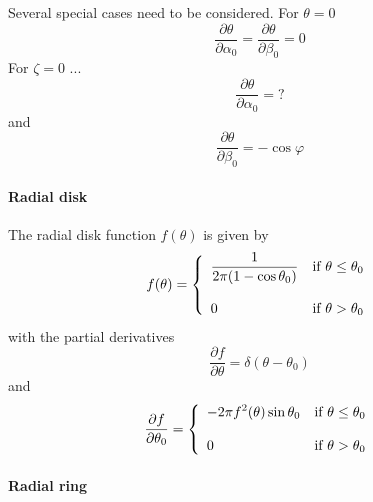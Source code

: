 \documentclass{article}[12pt,a4]
\begin{document}
Several special cases need to be considered.
For $\theta=0$
\begin{equation}
\frac{\partial \theta}{\partial \alpha_0} = \frac{\partial \theta}{\partial \beta_0} = 0
\end{equation}
For $\zeta=0$ ...
\begin{equation}
\frac{\partial \theta}{\partial \alpha_0} = ?
\end{equation}
and
\begin{equation}
\frac{\partial \theta}{\partial \beta_0} = - \cos \varphi
\end{equation}

\paragraph{Radial disk}

The radial disk function $f(\theta)$ is given by
\begin{equation}
f(\theta) = \left \{
   \begin{array}{l l}
     \displaystyle \frac{1}{2 \pi (1 - \cos \theta_0)} & \mbox{if $\theta \le \theta_0$} \\ \\
     \displaystyle 0 & \mbox{if $\theta > \theta_0$}
   \end{array}
   \right .
\end{equation}
with the partial derivatives
\begin{equation}
\frac{\partial f}{\partial \theta}  = \delta(\theta - \theta_0)
\end{equation}
and
\begin{equation}
\frac{\partial f}{\partial \theta_0} = \left \{
   \begin{array}{l l}
     \displaystyle -2 \pi f^2(\theta) \sin \theta_0 & \mbox{if $\theta \le \theta_0$} \\ \\
     \displaystyle 0 & \mbox{if $\theta > \theta_0$}
   \end{array}
   \right .
\end{equation}

\paragraph{Radial ring}
\end{document}
